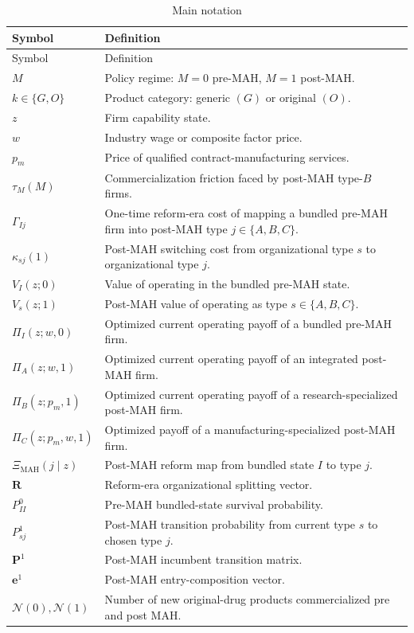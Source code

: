 \documentclass[12pt]{article}
\newcommand{\1}{\mathbf{1}}
\newcommand{\Inew}{\mathcal{N}}
\begin{document}
\begin{longtable}{p{}p{}}
\caption{Main notation}\label{tab:notation}\\
\toprule
Symbol & Definition \\
\midrule
\endfirsthead
\toprule
Symbol & Definition \\
\midrule
\endhead
$M$ & Policy regime: $M=0$ pre-MAH, $M=1$ post-MAH. \\
$k\in\{G,O\}$ & Product category: generic $(G)$ or original $(O)$. \\
$z$ & Firm capability state. \\
$w$ & Industry wage or composite factor price. \\
$p_m$ & Price of qualified contract-manufacturing services. \\
$\tau_M(M)$ & Commercialization friction faced by post-MAH type-$B$ firms. \\
$\Gamma_{Ij}$ & One-time reform-era cost of mapping a bundled pre-MAH firm into post-MAH type $j\in\{A,B,C\}$. \\
$\kappa_{sj}(1)$ & Post-MAH switching cost from organizational type $s$ to organizational type $j$. \\
$V_I(z;0)$ & Value of operating in the bundled pre-MAH state. \\
$V_s(z;1)$ & Post-MAH value of operating as type $s\in\{A,B,C\}$. \\
$\Pi_I(z;w,0)$ & Optimized current operating payoff of a bundled pre-MAH firm. \\
$\Pi_A(z;w,1)$ & Optimized current operating payoff of an integrated post-MAH firm. \\
$\Pi_B(z;p_m,1)$ & Optimized current operating payoff of a research-specialized post-MAH firm. \\
$\Pi_C(z;p_m,w,1)$ & Optimized payoff of a manufacturing-specialized post-MAH firm. \\
$\Xi_{\mathrm{MAH}}(j\mid z)$ & Post-MAH reform map from bundled state $I$ to type $j$. \\
$\mathbf R$ & Reform-era organizational splitting vector. \\
$P_{II}^0$ & Pre-MAH bundled-state survival probability. \\
$P_{sj}^1$ & Post-MAH transition probability from current type $s$ to chosen type $j$. \\
$\mathbf P^1$ & Post-MAH incumbent transition matrix. \\
$\mathbf e^1$ & Post-MAH entry-composition vector. \\
$\Inew(0),\Inew(1)$ & Number of new original-drug products commercialized pre and post MAH. \\
\bottomrule
\end{longtable}
\end{document}
